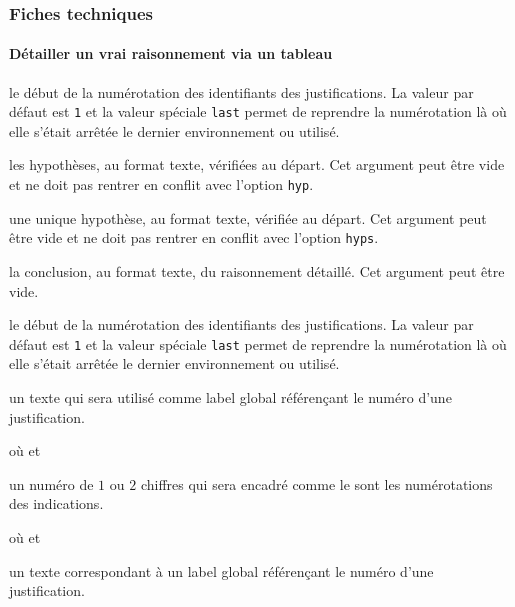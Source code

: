 \documentclass[12pt,a4paper]{article}
\begin{document}


\subsubsection{Fiches techniques}

\paragraph{Détailler un \og vrai \fg{} raisonnement via un tableau}


 le début de la numérotation des identifiants des justifications.
              La valeur par défaut est \verb+1+ et la valeur spéciale \verb+last+ permet de reprendre la numérotation là où elle s'était arrêtée le dernier environnement  ou  utilisé.

 les hypothèses, au format texte, vérifiées au départ.
             Cet argument peut être vide et ne doit pas rentrer en conflit avec l'option \verb+hyp+.

 une unique hypothèse, au format texte, vérifiée au départ.
            Cet argument peut être vide et ne doit pas rentrer en conflit avec l'option \verb+hyps+.

 la conclusion, au format texte, du raisonnement détaillé.
            Cet argument peut être vide.


\separation



 le début de la numérotation des identifiants des justifications.
              La valeur par défaut est \verb+1+ et la valeur spéciale \verb+last+ permet de reprendre la numérotation là où elle s'était arrêtée le dernier environnement  ou  utilisé.


\separation



\IDoption{} un texte qui sera utilisé comme label global référençant le numéro d'une justification.


\separation


 où \quad {}
                            et 

\IDarg{} un numéro de $1$ ou $2$ chiffres qui sera encadré comme le sont les numérotations des indications.


\separation


 où \quad {}
                             et 

\IDarg{} un texte correspondant à un label global référençant le numéro d'une justification.
\end{document}
